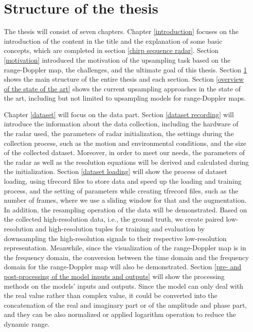 \section{Structure of the thesis} \label{structure of the thesis}
The thesis will consist of seven chapters. Chapter \ref{introduction} focuses on the introduction of the content in the title and the explanation of some basic concepts, which are completed in section \ref{chirp sequence radar}. Section \ref{motivation} introduced the motivation of the upsampling task based on the range-Doppler map, the challenges, and the ultimate goal of this thesis. Section \ref{structure of the thesis} shows the main structure of the entire thesis and each section. Section \ref{overview of the state of the art} shows the current upsampling approaches in the state of the art, including but not limited to upsampling models for range-Doppler maps.

Chapter \ref{dataset} will focus on the data part. Section \ref{dataset recording} will introduce the information about the data collection, including the hardware of the radar used, the parameters of radar initialization, the settings during the collection process, such as the motion and environmental conditions, and the size of the collected dataset. Moreover, in order to meet our needs, the parameters of the radar as well as the resolution equations will be derived and calculated during the initialization. Section \ref{dataset loading} will show the process of dataset loading, using \gls{tfrecord} files to store data and speed up the loading and training process, and the setting of parameters while creating \gls{tfrecord} files, such as the number of frames, where we use a sliding window for that and the augmentation. In addition, the resampling operation of the data will be demonstrated. Based on the collected high-resolution data, i.e., the ground truth, we create paired low-resolution and high-resolution tuples for training and evaluation by downsampling the high-resolution signals to their respective low-resolution representation. Meanwhile, since the visualization of the range-Doppler map is in the frequency domain, the conversion between the time domain and the frequency domain for the range-Doppler map will also be demonstrated. Section \ref{pre- and post-processing of the model inputs and outputs} will show the processing methods on the models' inputs and outputs. Since the model can only deal with the real value rather than complex value, it could be converted into the concatenation of the real and imaginary part or of the amplitude and phase part, and they can be also normalized or applied logarithm operation to reduce the dynamic range.

